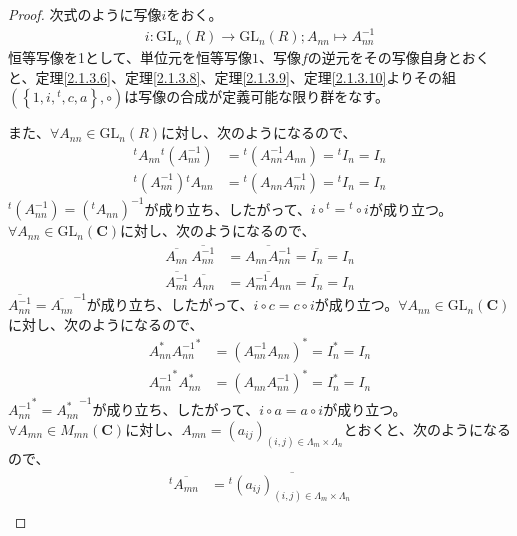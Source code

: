 \documentclass[dvipdfmx]{jsarticle}
\begin{document}
\begin{proof}
次式のように写像$i$をおく。
\begin{align*}
i:{\mathrm{GL}}_{n}(R) \rightarrow {\mathrm{GL}}_{n}(R);A_{nn} \mapsto A_{nn}^{- 1}
\end{align*}
恒等写像を1として、単位元を恒等写像$1$、写像$f$の逆元をその写像自身とおくと、定理\ref{2.1.3.6}、定理\ref{2.1.3.8}、定理\ref{2.1.3.9}、定理\ref{2.1.3.10}よりその組$\left( \left\{ 1,i,{}^{t},c,a \right\}, \circ \right)$は写像の合成が定義可能な限り群をなす。\par
また、$\forall A_{nn} \in {\mathrm{GL}}_{n}(R)$に対し、次のようになるので、
\begin{align*}
{}^{t}A_{nn}{}^{t}\left( A_{nn}^{- 1} \right) &={}^{t}\left( A_{nn}^{- 1}A_{nn} \right) ={}^{t}I_{n} = I_{n}\\
{}^{t}\left( A_{nn}^{- 1} \right){}^{t}A_{nn} &={}^{t}\left( A_{nn}A_{nn}^{- 1} \right) ={}^{t}I_{n} = I_{n}
\end{align*}
${}^{t}\left( A_{nn}^{- 1} \right) = \left({}^{t}A_{nn} \right)^{- 1}$が成り立ち、したがって、$i \circ{}^{t} ={}^{t} \circ i$が成り立つ。$\forall A_{nn} \in {\mathrm{GL}}_{n}\left( \mathbf{C} \right)$に対し、次のようになるので、
\begin{align*}
\overline{A_{nn}}\ \overline{A_{nn}^{- 1}} &= \overline{A_{nn}A_{nn}^{- 1}} = \overline{I_{n}} = I_{n}\\
\overline{A_{nn}^{- 1}}\ \overline{A_{nn}} &= \overline{A_{nn}^{- 1}A_{nn}} = \overline{I_{n}} = I_{n}
\end{align*}
$\overline{A_{nn}^{- 1}} = {\overline{A_{nn}}}^{- 1}$が成り立ち、したがって、$i \circ c = c \circ i$が成り立つ。$\forall A_{nn} \in {\mathrm{GL}}_{n}\left( \mathbf{C} \right)$に対し、次のようになるので、
\begin{align*}
A_{nn}^{*}{A_{nn}^{- 1}}^{*} &= \left( A_{nn}^{- 1}A_{nn} \right)^{*} = I_{n}^{*} = I_{n}\\
{A_{nn}^{- 1}}^{*}A_{nn}^{*} &= \left( A_{nn}A_{nn}^{- 1} \right)^{*} = I_{n}^{*} = I_{n}
\end{align*}
${A_{nn}^{- 1}}^{*} = {A_{nn}^{*}}^{- 1}$が成り立ち、したがって、$i \circ a = a \circ i$が成り立つ。$\forall A_{mn} \in M_{mn}\left( \mathbf{C} \right)$に対し、$A_{mn} = \left( a_{ij} \right)_{(i,j) \in \varLambda_{m} \times \varLambda_{n}}$とおくと、次のようになるので、
\begin{align*}
{}^{t}\overline{A_{mn}} &={}^{t}\overline{\left( a_{ij} \right)_{(i,j) \in \varLambda_{m} \times \varLambda_{n}}}\\

\end{align*}
\end{proof}
\end{document}
